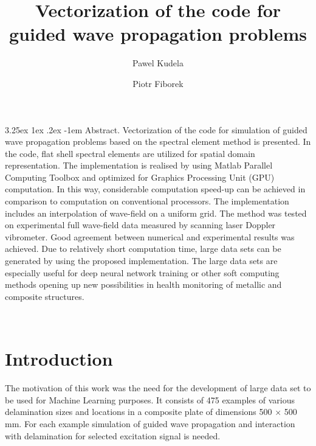 \documentclass[runningheads]{llncs}
\makeatletter
\renewcommand\paragraph{\@startsection{paragraph}{4}{\z@}%
                                    {3.25ex \@plus1ex \@minus.2ex}%
                                    {-1em}%
                                    {\normalfont\normalsize\bfseries}}
\makeatother
\begin{document}
%
\title{Vectorization of the code for guided wave propagation problems}
%
%
\author{Pawel Kudela\inst{}  \and 
Piotr Fiborek\inst{}\orcidID{[0000-0002-5030-3312} 
}
%
%

%
\maketitle              %
%
\paragraph{Abstract.}
Vectorization of the code for simulation of guided wave propagation problems based on the spectral element method is presented. 
In the code, flat shell spectral elements are utilized for spatial domain representation.
The implementation is realised by using Matlab Parallel Computing Toolbox and optimized for Graphics Processing Unit (GPU) computation. 
In this way, considerable computation speed-up can be achieved in comparison to computation on conventional processors. 
The implementation includes an interpolation of wave-field on a uniform grid. 
The method was tested on experimental full wave-field data measured by scanning laser Doppler vibrometer. 
Good agreement between numerical and experimental results was achieved. 
Due to relatively short computation time, large data sets can be generated by using the proposed implementation. 
The large data sets are especially useful for deep neural network training or other soft computing methods opening up new possibilities in health monitoring of metallic and composite structures.

%
\\[2em]
%
\section{Introduction}
The motivation of this work was the need for the development of large data set to be used for Machine Learning purposes. 
It consists of 475 examples of various delamination sizes and locations in a composite plate of dimensions 500 \(\times\) 500 mm.
For each example simulation of guided wave propagation and interaction with delamination for selected excitation signal is needed.
 
\end{document}
